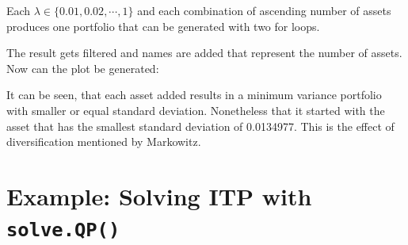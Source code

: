 \documentclass[
  oneside]{book}
\newenvironment{Shaded}{\begin{snugshade}}{\end{snugshade}}
\newcommand{\AttributeTok}[1]{\textcolor[rgb]{0.77,0.63,0.00}{#1}}
\newcommand{\ConstantTok}[1]{\textcolor[rgb]{0.00,0.00,0.00}{#1}}
\newcommand{\ControlFlowTok}[1]{\textcolor[rgb]{0.13,0.29,0.53}{\textbf{#1}}}
\newcommand{\FunctionTok}[1]{\textcolor[rgb]{0.00,0.00,0.00}{#1}}
\newcommand{\NormalTok}[1]{#1}
\newcommand{\OtherTok}[1]{\textcolor[rgb]{0.56,0.35,0.01}{#1}}
\newcommand{\SpecialCharTok}[1]{\textcolor[rgb]{0.00,0.00,0.00}{#1}}
\newcommand{\StringTok}[1]{\textcolor[rgb]{0.31,0.60,0.02}{#1}}
\begin{document}
\begin{Shaded}
\end{Shaded}

Each \(\lambda \in \{0.01, 0.02, \cdots, 1\}\) and each combination of ascending number of assets produces one portfolio that can be generated with two for loops.

The result gets filtered and names are added that represent the number of assets. Now can the plot be generated:

It can be seen, that each asset added results in a minimum variance portfolio with smaller or equal standard deviation. Nonetheless that it started with the asset that has the smallest standard deviation of 0.0134977. This is the effect of diversification mentioned by Markowitz.

\hypertarget{example-solving-itp-with-solve.qp}{%
\section{\texorpdfstring{Example: Solving ITP with \texttt{solve.QP()}}{Example: Solving ITP with solve.QP()}}\label{example-solving-itp-with-solve.qp}}
\end{document}
